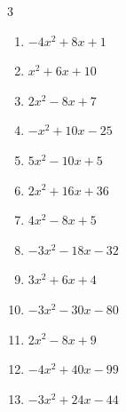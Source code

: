 \begin{multicols}{3}
\begin{enumerate}

  \item $-4x^{2}+8x+1$


  \item $x^{2}+6x+10$


  \item $2x^{2}-8x+7$


  \item $-x^{2}+10x-25$


  \item $5x^{2}-10x+5$


  \item $2x^{2}+16x+36$


  \item $4x^{2}-8x+5$


  \item $-3x^{2}-18x-32$


\columnbreak %

  \item $3x^{2}+6x+4$


  \item $-3x^{2}-30x-80$


  \item $2x^{2}-8x+9$


  \item $-4x^{2}+40x-99$


  \item $-3x^{2}+24x-44$



\end{enumerate}
\end{multicols}
